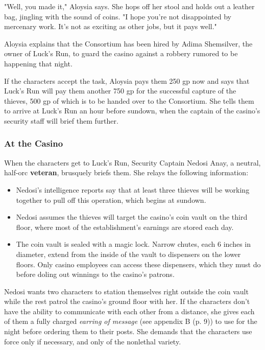 \documentclass[a4paper, 11pt, bg=full, twocolumn, nooutline]{dndbook}
\begin{document}
\begin{DndReadAloud}
"Well, you made it," Aloysia says. She hops off her stool and holds out a leather bag, jingling with the sound of coins. "I hope you're not disappointed by mercenary work. It's not as exciting as other jobs, but it pays well."
\end{DndReadAloud}

Aloysia explains that the Consortium has been hired by Adima Shemsilver, the owner of Luck's Run, to guard the casino against a robbery rumored to be happening that night.

If the characters accept the task, Aloysia pays them 250 gp now and says that Luck's Run will pay them another 750 gp for the successful capture of the thieves, 500 gp of which is to be handed over to the Consortium. She tells them to arrive at Luck's Run an hour before sundown, when the captain of the casino's security staff will brief them further.

\subsubsection{At the Casino}

When the characters get to Luck's Run, Security Captain Nedosi Anay, a neutral, half-orc \textbf{veteran}, brusquely briefs them. She relays the following information:

\begin{itemize}
\item Nedosi's intelligence reports say that at least three thieves will be working together to pull off this operation, which begins at sundown.
\item Nedosi assumes the thieves will target the casino's coin vault on the third floor, where most of the establishment's earnings are stored each day.
\item The coin vault is sealed with a magic lock. Narrow chutes, each 6 inches in diameter, extend from the inside of the vault to dispensers on the lower floors. Only casino employees can access these dispensers, which they must do before doling out winnings to the casino's patrons.
\end{itemize}

Nedosi wants two characters to station themselves right outside the coin vault while the rest patrol the casino's ground floor with her. If the characters don't have the ability to communicate with each other from a distance, she gives each of them a fully charged \textit{earring of message} (see appendix B (p. 9)) to use for the night before ordering them to their posts. She demands that the characters use force only if necessary, and only of the nonlethal variety.
\end{document}
